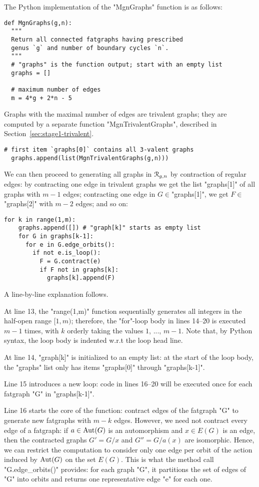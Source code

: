 The Python implementation of the "MgnGraphs" function is as follows:
\begin{lstlisting}[name=MgnGraphs,firstnumber=1]
def MgnGraphs(g,n):
  """
  Return all connected fatgraphs having prescribed
  genus `g` and number of boundary cycles `n`.
  """
  # "graphs" is the function output; start with an empty list
  graphs = []

  # maximum number of edges
  m = 4*g + 2*n - 5
\end{lstlisting}
Graphs with the maximal number of edges are trivalent graphs; they are
computed by a separate function "MgnTrivalentGraphs", described in
Section~\ref{sec:stage1-trivalent}.
\begin{lstlisting}[name=MgnGraphs,firstnumber=11]
  # first item `graphs[0]` contains all 3-valent graphs
  graphs.append(list(MgnTrivalentGraphs(g,n)))
\end{lstlisting}
We can then proceed to generating all graphs in $\mathcal{R}_{g,n}$ by
contraction of regular edges: by contracting one edge in
trivalent graphs we get the list "graphs[1]" of all graphs with
$m-1$ edges; contracting one edge in $G \in $"graphs[1]", we
get $F \in $"graphs[2]" with $m-2$ edges; and so on:
\begin{lstlisting}[name=MgnGraphs,firstnumber=13]
  for k in range(1,m):
    graphs.append([]) # "graph[k]" starts as empty list
    for G in graphs[k-1]:
      for e in G.edge_orbits():
        if not e.is_loop():
          F = G.contract(e)
          if F not in graphs[k]:
            graphs[k].append(F)
\end{lstlisting}
A line-by-line explanation follows.

At line 13, the "range(1,m)" function sequentially generates all
integers in the half-open range $[1, m)$; therefore, the "for"-loop
body in lines 14--20 is executed $m-1$ times, with $k$ orderly taking
the values $1$, ..., $m-1$.  Note that, by Python syntax, the loop
body is indented w.r.t the loop head line.

At line 14, "graph[k]" is initialized to an empty list: at the start
of the loop body, the "graphs" list only has items "graphs[0]"
through "graphs[k-1]".

Line 15 introduces a new loop: code in lines 16--20 will be executed
once for each fatgraph "G" in "graphs[k-1]".

Line 16 starts the core of the function: contract edges of the
fatgraph "G" to generate new fatgraphs with $m-k$ edges.  However,
we need not contract every edge of a fatgraph: if $a \in \operatorname{Aut}(G)$ is
an automorphism and $x \in E(G)$ is an edge, then the contracted
graphs $G' = G/x$ and $G'' = G/a(x)$ are isomorphic.  Hence, we can
restrict the computation to consider only one edge per orbit of the
action induced by $\operatorname{Aut}(G)$ on the set $E(G)$. This is what the method
call "G.edge_orbits()" provides: for each graph "G", it partitions
the set of edges of "G" into orbits and returns one representative
edge "e" for each one.

